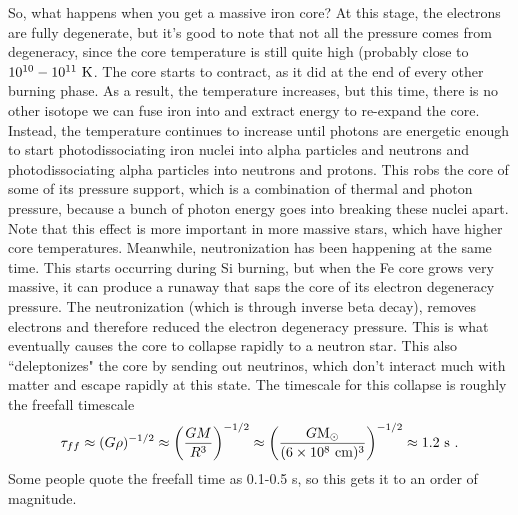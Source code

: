 So, what happens when you get a massive iron core? At this stage, the electrons are fully degenerate, but it's good to note that not all the pressure comes from degeneracy, since the core temperature is still quite high (probably close to $10^{10}-10^{11}~{\rm K}$. The core starts to contract, as it did at the end of every other burning phase. As a result, the temperature increases, but this time, there is no other isotope we can fuse iron into and extract energy to re-expand the core. Instead, the temperature continues to increase until photons are energetic enough to start photodissociating iron nuclei into alpha particles and neutrons and photodissociating alpha particles into neutrons and protons. This robs the core of some of its pressure support, which is a combination of thermal and photon pressure, because a bunch of photon energy goes into breaking these nuclei apart. Note that this effect is more important in more massive stars, which have higher core temperatures. Meanwhile, neutronization has been happening at the same time. This starts occurring during Si burning, but when the Fe core grows very massive, it can produce a runaway that saps the core of its electron degeneracy pressure. The neutronization (which is through inverse beta decay), removes electrons and therefore reduced the electron degeneracy pressure. This is what eventually causes the core to collapse rapidly to a neutron star. This also ``deleptonizes" the core by sending out neutrinos, which don't interact much with matter and escape rapidly at this state. The timescale for this collapse is roughly the freefall timescale
\begin{equation}
\tau_{ff} \approx (G\rho)^{-1/2} \approx \biggl(\frac{GM}{R^3}\biggr)^{-1/2} \approx \biggl(\frac{G{\rm M}_\odot}{(6\times 10^8~{\rm cm})^3}\biggr)^{-1/2} \approx 1.2~{\rm s}\,\,.
\end{equation}
Some people quote the freefall time as 0.1-0.5 s, so this gets it to an order of magnitude.

